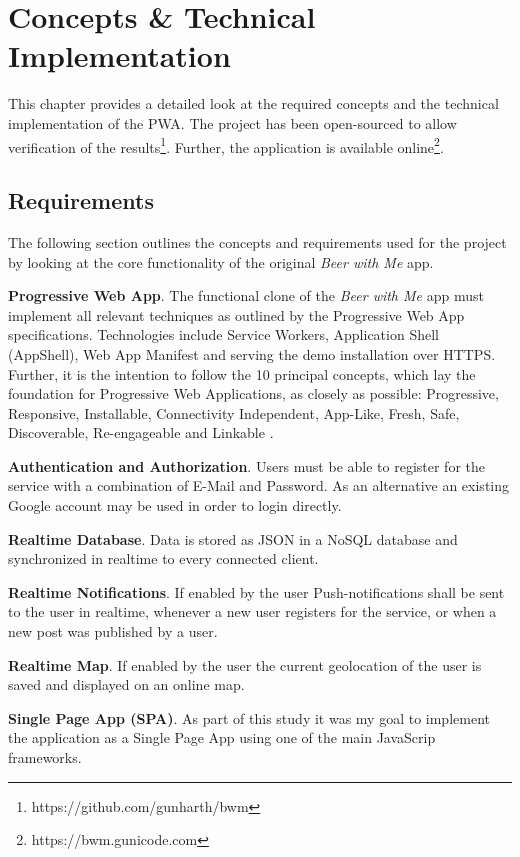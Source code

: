 \chapter{Concepts \& Technical Implementation}
This chapter provides a detailed look at the required concepts and the technical implementation of the PWA. The project has been open-sourced to allow verification of the results\footnote{https://github.com/gunharth/bwm}. Further, the application is available online\footnote{https://bwm.gunicode.com}.

\section{Requirements}

The following section outlines the concepts and requirements used for the project by looking at the core functionality of the original \textit{Beer with Me} app.

\textbf{Progressive Web App}. The functional clone of the \textit{Beer with Me} app must implement all relevant techniques as outlined by the Progressive Web App specifications. Technologies include Service Workers, Application Shell (AppShell), Web App Manifest and serving the demo installation over HTTPS. Further, it is the intention to follow the 10 principal concepts, which lay the foundation for Progressive Web Applications, as closely as possible: Progressive, Responsive, Installable, Connectivity Independent, App-Like, Fresh, Safe, Discoverable, Re-engageable and Linkable \citep{osmaniGettingStartedProgressive2015}.

\textbf{Authentication and Authorization}. Users must be able to register for the service with a combination of E-Mail and Password. As an alternative an existing Google account may be used in order to login directly.

\textbf{Realtime Database}. Data is stored as JSON in a NoSQL database and synchronized in realtime to every connected client.

\textbf{Realtime Notifications}. If enabled by the user Push-notifications shall be sent to the user in realtime, whenever a new user registers for the service, or when a new post was published by a user.

\textbf{Realtime Map}. If enabled by the user the current geolocation of the user is saved and displayed on an online map.

\textbf{Single Page App (SPA)}. As part of this study it was my goal to implement the application as a Single Page App using one of the main JavaScrip frameworks.

